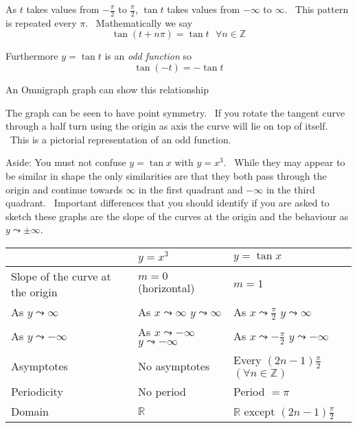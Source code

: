 As $t$ takes values from $ -\frac{\pi }{2}$ to $\frac{\pi }{2}$, $\tan  t$ takes values from $ -\infty $ to $\infty $. \ This pattern is repeated every $\pi $. \ Mathematically we say
\begin{equation*}\tan  \left (t +n \pi \right ) =\tan  t\text{\ \ \ } \forall n \in \mathbb{Z}
\end{equation*}

Furthermore $y =\tan  t$ is an \emph{odd function} so
\begin{equation*}\tan  \left ( -t\right ) = -\tan  t
\end{equation*}

An Omnigraph graph can show this relationship 

   
\setlength\fboxrule{0.01in}\setlength\fboxsep{0.2in}


The graph can be seen to have point symmetry. \ If you rotate the tangent curve through
a half turn using the origin as axis the curve will lie on top of itself. \ This is a pictorial representation
of an odd function.

Aside: You must not confuse $y =\tan  x$ with $y =x^{3}$. \ While they may appear to be similar in shape the only similarities are that they both
pass through the origin and continue towards $\infty $ in the first quadrant and $ -\infty $ in the third quadrant. \ Important differences that you should identify if you
are asked to sketch these graphs are the slope of the curves at the origin and the behaviour as $y \leadsto  \pm \infty $. 


\begin{tabular}[c]{l|l|l|}  & $y =x^{3}$  & $y =\tan  x$  \\
\hline
Slope of the curve at the origin  & $m =0$ {\scriptsize (horizontal)}  & $m =1$  \\
\hline
As $y \leadsto \infty $  & As $x \leadsto \infty $ $y \leadsto \infty $  & As $x \leadsto \frac{\pi }{2}$ $y \leadsto \infty $  \\
\hline
As $y \leadsto  -\infty $  & As $x \leadsto  -\infty $ $y \leadsto  -\infty $  & As $x \leadsto  -\frac{\pi }{2}$ $y \leadsto  -\infty $  \\
\hline
Asymptotes  & No
asymptotes  & Every $\left (2 n -1\right ) \frac{\pi }{2}$ $\left ( \forall n \in \mathbb{Z}\right )$  \\
\hline
Periodicity
& No period  & Period $ =\pi $  \\
\hline
Domain  & $\mathbb{R}$  & $\mathbb{R}$ except $\left (2 n -1\right ) \frac{\pi }{2}$  \\
\hline
\end{tabular}

